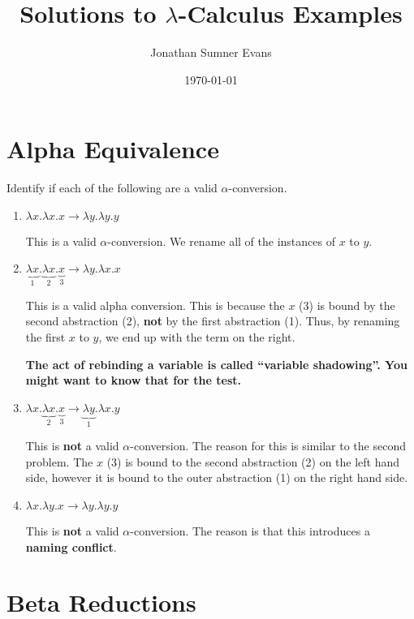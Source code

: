 \documentclass{hw}
\author{Jonathan Sumner Evans}
\title{Solutions to $\lambda$-Calculus Examples}
\date{\today}
\begin{document}
\maketitle

\section{Alpha Equivalence}

Identify if each of the following are a valid $\alpha$-conversion.

\begin{enumerate}
    \item ${\lambda}x.{\lambda}x.x \to {\lambda}y.{\lambda}y.y$

        This is a valid $\alpha$-conversion. We rename all of the instances of
        $x$ to $y$.

    \item $\underbrace{{\lambda}x}_1.\underbrace{{\lambda}x}_2.\underbrace{x}_3 \to {\lambda}y.{\lambda}x.x$

        This is a valid alpha conversion. This is because the $x$ (3) is bound
        by the second abstraction (2), \textbf{not} by the first abstraction
        (1). Thus, by renaming the first $x$ to $y$, we end up with the term on
        the right.

        \textbf{The act of rebinding a variable is called ``variable
            shadowing''. You might want to know that for the test.}

    \item ${\lambda}x.\underbrace{{\lambda}x}_2.\underbrace{x}_3 \to
        \underbrace{{\lambda}y}_1.{\lambda}x.y$

        This is \textbf{not} a valid $\alpha$-conversion. The reason for this is
        similar to the second problem. The $x$ (3) is bound to the second
        abstraction (2) on the left hand side, however it is bound to the outer
        abstraction (1) on the right hand side.

    \item ${\lambda}x.{\lambda}y.x \to {\lambda}y.{\lambda}y.y$

        This is \textbf{not} a valid $\alpha$-conversion. The reason is that
        this introduces a \textbf{naming conflict}.

\end{enumerate}

\newpage
\section{Beta Reductions}
\end{document}
